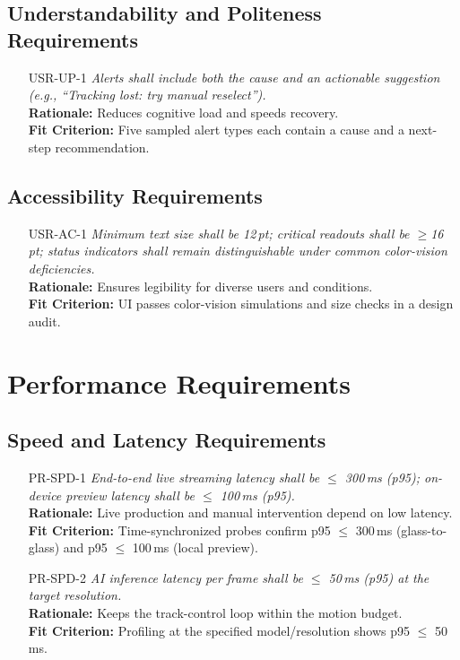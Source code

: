 \documentclass[12pt]{article}
\begin{document}
\subsection{Understandability and Politeness Requirements}
\begin{itemize}[leftmargin=*]
  \item[USR-UP-1] \emph{Alerts shall include both the cause and an actionable
          suggestion (e.g., “Tracking lost: try manual reselect”).}\\ \textbf{Rationale:}
        Reduces cognitive load and speeds recovery.\\ \textbf{Fit Criterion:} Five
        sampled alert types each contain a cause and a next-step recommendation.
\end{itemize}

\subsection{Accessibility Requirements}
\begin{itemize}[leftmargin=*]
  \item[USR-AC-1] \emph{Minimum text size shall be 12\,pt; critical readouts shall be
          $\geq$16\,pt; status indicators shall remain distinguishable under common
          color-vision deficiencies.}\\ \textbf{Rationale:} Ensures legibility for
        diverse users and conditions.\\ \textbf{Fit Criterion:} UI passes color-vision
        simulations and size checks in a design audit.
\end{itemize}

\section{Performance Requirements}
\subsection{Speed and Latency Requirements}
\begin{itemize}[leftmargin=*]
  \item[PR-SPD-1] \emph{End-to-end live streaming latency shall be $\leq$ 300\,ms
          (p95); on-device preview latency shall be $\leq$ 100\,ms (p95).}\\
        \textbf{Rationale:} Live production and manual intervention depend on low
        latency.\\ \textbf{Fit Criterion:} Time-synchronized probes confirm p95 $\leq$
        300\,ms (glass-to-glass) and p95 $\leq$ 100\,ms (local preview).

  \item[PR-SPD-2] \emph{AI inference latency per frame shall be $\leq$ 50\,ms (p95) at
          the target resolution.}\\ \textbf{Rationale:} Keeps the track-control loop
        within the motion budget.\\ \textbf{Fit Criterion:} Profiling at the specified
        model/resolution shows p95 $\leq$ 50\,ms.
\end{itemize}
\end{document}
